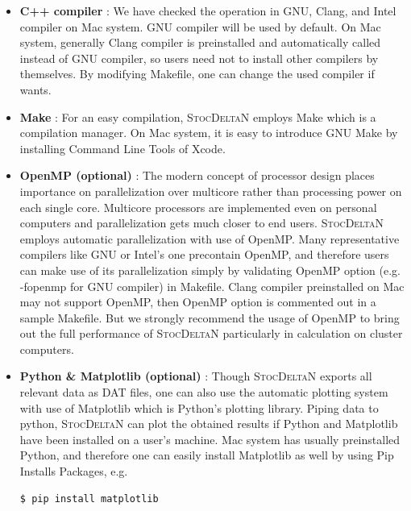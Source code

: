 \documentclass[aps, prd
, preprint
, nofootinbib 
, notitlepage
, superscriptaddress
, longbibliography
]{revtex4-1}
\begin{document}
\begin{itemize}
\item {\sffamily\bfseries C++ compiler} : We have checked the operation in GNU, Clang, and Intel compiler on Mac system. GNU compiler will be used by default.
On Mac system, generally Clang compiler is preinstalled and automatically called instead of GNU compiler, so users need not to install other compilers by themselves. 
By modifying Makefile, one can change the used compiler if wants.

\item {\sffamily\bfseries Make} : For an easy compilation, \textsc{StocDeltaN} employs Make which is a compilation manager. On Mac system, it is easy to introduce GNU Make
by installing Command Line Tools of Xcode.

\item {\sffamily\bfseries OpenMP (optional)} : The modern concept of processor design places importance on parallelization over multicore rather than processing power on each single core. 
Multicore processors are implemented even on personal computers and parallelization gets much closer to end users.
\textsc{StocDeltaN} employs automatic parallelization with use of OpenMP. Many representative compilers like GNU or Intel's one precontain OpenMP, and therefore
users can make use of its parallelization simply by validating OpenMP option (e.g. -fopenmp for GNU compiler) in Makefile.
Clang compiler preinstalled on Mac may not support OpenMP, then OpenMP option is commented out in a sample Makefile.
But we strongly recommend the usage of OpenMP to bring out the full performance of \textsc{StocDeltaN} particularly in calculation on cluster computers.

\item{\sffamily\bfseries Python \& Matplotlib (optional)} : Though \textsc{StocDeltaN} exports all relevant data as DAT files, one can also use the automatic plotting system
with use of Matplotlib which is Python's plotting library. Piping data to python, \textsc{StocDeltaN} can plot the obtained results if Python and Matplotlib have been installed
on a user's machine. Mac system has usually preinstalled Python, and therefore one can easily install Matplotlib as well by using Pip Installs Packages, e.g.
\begin{lstlisting}[language = bash, numbers = none]
$ pip install matplotlib
\end{lstlisting}

\end{itemize}
\end{document}
